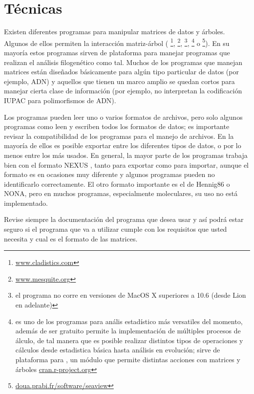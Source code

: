 


\section*{T\'ecnicas}

Existen diferentes programas para manipular matrices de datos y \'arboles. Algunos de ellos permiten la interacci\'on matriz-\'arbol (
\footnote{\url{www.cladistics.com}}, 
\footnote{\url{www.mesquite.org}}, 
\footnote{el programa no corre en versiones de MacOS X superiores a 10.6 (desde Lion en adelante)}, 
\footnote{ es uno de los programas para an\'alis estad\'istico m\'as versatiles del momento, adem\'as de ser gratuito permite la implementaci\'on de m\'ultiples procesos de \'alculo, de tal manera que es posible realizar distintos tipos de operaciones y c\'alculos desde estadistica b\'asica hasta an\'alisis en evoluci\'on; sirve de plataforma para  \cite{paradis2008}, un m\'odulo que permite distintas acciones con matrices y \'arboles 
\url{cran.r-project.org}}  o 
\footnote{\url{doua.prabi.fr/software/seaview}}). En su mayor\'ia estos programas sirven de plataforma para manejar programas que realizan el an\'alisis filogen\'etico como tal. Muchos de los programas que manejan matrices est\'an dise\~nados b\'asicamente para alg\'un tipo particular de datos (por ejemplo, ADN) y aquellos que tienen un marco amplio se quedan cortos para manejar cierta clase de informaci\'on (por ejemplo, no interpretan la codificaci\'on IUPAC para polimorfismos de ADN).

Los programas pueden leer uno o varios formatos de archivos, pero solo algunos programas como  leen y escriben todos los formatos de datos; es importante revisar la compatibilidad de los programas para el manejo de archivos. En la mayor\'ia de ellos es posible exportar entre los diferentes tipos de datos, o por lo menos entre los m\'as usados. En general, la mayor parte de los programas trabaja bien con el formato NEXUS \cite{Maddison1997}, tanto para exportar como para importar, aunque el formato es en ocasiones muy diferente y algunos programas pueden no identificarlo correctamente. El otro formato importante es el de Hennig86 o NONA, pero en muchos programas, especialmente moleculares, su uso no est\'a implementado.

Revise siempre la documentaci\'on del programa que desea usar y as\'i podr\'a estar seguro si el programa que va a utilizar cumple con los requisitos que usted necesita y cual es el formato de las matrices.

